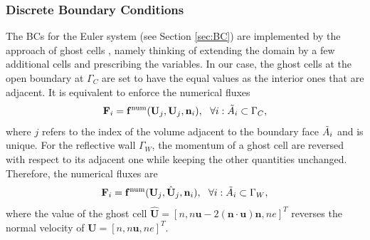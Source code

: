 \documentclass{article}
\begin{document}
\subsubsection{Discrete Boundary Conditions}
The BCs for the Euler system (see Section \ref{sec:BC}) are implemented by the approach of ghost cells \cite[][ch. 7]{leveque_2007}, namely thinking of extending the domain by a few additional cells and prescribing the variables. In our case, the ghost cells at the open boundary at $\Gamma_C$ are set to have the equal values as the interior ones that are adjacent. It is equivalent to enforce the numerical fluxes
\begin{equation*}
    \mathbf{F}_i = {\mathbf{f}^\text{num}}(\mathbf{U}_j, \mathbf{U}_j, \mathbf{n}_i), \ \ \forall i: \Tilde{A}_i \subset \Gamma_C,
\end{equation*}
where $j$ refers to the index of the volume adjacent to the boundary face $\Tilde{A}_i$ and is unique. For the reflective wall $\Gamma_W$, the momentum of a ghost cell are reversed with respect to its adjacent one while keeping the other quantities unchanged. Therefore, the numerical fluxes are 
\begin{equation*}
    \mathbf{F}_i = \mathbf{f}^\text{num}(\mathbf{U}_j, \hat{\mathbf{U}}_j, \mathbf{n}_i), \ \ \forall i: \Tilde{A}_i \subset \Gamma_W,
\end{equation*}
where the value of the ghost cell $\hat{\mathbf{U}} = [n, n\mathbf{u} - 2(\mathbf{n}\cdot\mathbf{u})\mathbf{n}, ne]^T$ reverses the normal velocity of $\mathbf{U} = [n, n\mathbf{u}, ne]^T$. 
\end{document}
